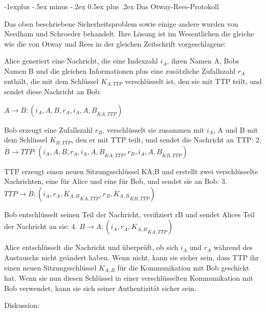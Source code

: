 \documentclass[a4paper]{article}
\makeatletter
\renewcommand{\subsection}{\@startsection{subsection}{2}{0mm}%
 {-1explus -.5ex minus -.2ex}%
 {0.5ex plus .2ex}%
 {\normalfont\normalsize\bfseries}}
\makeatother
\begin{document}
\begin{multicols}{3}
      \subsection{Das Otway-Rees-Protokoll}
      \begin{itemize*}
            \item Das oben beschriebene Sicherheitsproblem sowie einige andere wurden von Needham und Schroeder behandelt. Ihre Lösung ist im Wesentlichen die gleiche wie die von Otway und Rees in der gleichen Zeitschrift vorgeschlagene:
            \begin{itemize*}
                  \item Alice generiert eine Nachricht, die eine Indexzahl $i_A$, ihren Namen A, Bobs Namen B und die gleichen Informationen plus eine zusätzliche Zufallszahl $r_A$ enthält, die mit dem Schlüssel $K_{A,TTP}$ verschlüsselt ist, den sie mit TTP teilt, und sendet diese Nachricht an Bob:
                  \begin{enumerate*}
                        \item $A\rightarrow B:(i_A, A, B,{r_A, i_A, A, B}_{{K}{A,TTP}})$
                  \end{enumerate*}
                  \item Bob erzeugt eine Zufallszahl $r_B$, verschlüsselt sie zusammen mit $i_A$, A und B mit dem Schlüssel $K_{B,TTP}$, den er mit TTP teilt, und sendet die Nachricht an TTP: 2. $B\rightarrow TTP:(i_A, A, B,{r_A,i_A,A,B}_{{K}{A,TTP}},{r_B,i_A,A,B}_{{K}{B,TTP}})$
                  \item TTP erzeugt einen neuen Sitzungsschlüssel KA,B und erstellt zwei verschlüsselte Nachrichten, eine für Alice und eine für Bob, und sendet sie an Bob: 3. $TTP\rightarrow B:(i_A,{r_A,K_{A,B}}_{{K}{A,TTP}},{r_B, K_{A,B}}_{{K}{B,TTP}})$
                  \item Bob entschlüsselt seinen Teil der Nachricht, verifiziert rB und sendet Alices Teil der Nachricht an sie: 4. $B\rightarrow A:(i_A,{r_A,K_{A,B}}_{{K}{A,TTP}})$
                  \item Alice entschlüsselt die Nachricht und überprüft, ob sich $i_A$ und $r_A$ während des Austauschs nicht geändert haben. Wenn nicht, kann sie sicher sein, dass TTP ihr einen neuen Sitzungsschlüssel $K_{A,B}$ für die Kommunikation mit Bob geschickt hat. Wenn sie nun diesen Schlüssel in einer verschlüsselten Kommunikation mit Bob verwendet, kann sie sich seiner Authentizität sicher sein.
            \end{itemize*}
            \item Diskussion:

\end{itemize*}
\end{multicols}
\end{document}
